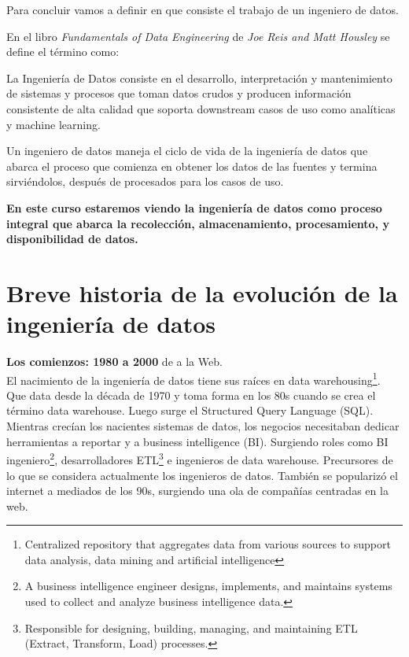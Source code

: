\documentclass[12pt]{book}
\begin{document}
Para concluir vamos a definir en que consiste el trabajo de un ingeniero de datos. 

En el libro \textit{Fundamentals of Data Engineering} de \textit{Joe Reis and Matt Housley} se define el término como:

La Ingeniería de Datos consiste en el desarrollo, interpretación y mantenimiento de sistemas y procesos que toman datos crudos y producen información consistente de alta calidad que soporta downstream casos de uso como analíticas y machine learning.

Un ingeniero de datos maneja el ciclo de vida de la ingeniería de datos que abarca el proceso que comienza en obtener los datos de las fuentes y termina sirviéndolos, después de procesados para los casos de uso.

\textbf{En este curso estaremos viendo la ingeniería de datos como proceso integral que abarca la recolección, almacenamiento, procesamiento, y disponibilidad de datos.}\\

\section{Breve historia de la evolución de la ingeniería de datos}
\textbf{Los comienzos: 1980 a 2000} de  a la Web.\\
El nacimiento de la ingeniería de datos tiene sus raíces en data warehousing\footnote{Centralized repository that aggregates data from various sources to support data analysis, data mining and artificial intelligence}.\\
Que data desde la década de 1970 y toma forma en los 80s cuando se crea el término data warehouse. Luego surge el Structured Query Language (SQL).
Mientras crecían los nacientes sistemas de datos, los negocios necesitaban dedicar herramientas a reportar y a business intelligence (BI). 
Surgiendo roles como BI ingeniero\footnote{A business intelligence engineer designs, implements, and maintains systems used to collect and analyze business intelligence data.}, desarrolladores ETL\footnote{Responsible for designing, building, managing, and maintaining ETL (Extract, Transform, Load) processes.} e ingenieros de data warehouse.
Precursores de lo que se considera actualmente los ingenieros de datos. También se popularizó el internet a mediados de los 90s, surgiendo una ola de compañías centradas en la web.
\end{document}

